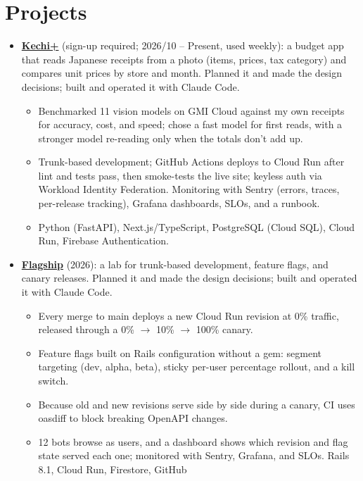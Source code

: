 \documentclass[10pt,letterpaper]{article}
\newcommand{\extlink}[2]{\href{#1}{\color{accent}#2}}
\begin{document}
\section*{Projects}
\begin{itemize}\sloppy
  \item \extlink{https://kechi-plus-g6bg.web.app/}{\textbf{Kechi+}} (sign-up required;
    2026/10 -- Present, used weekly): a budget app that reads Japanese receipts from a photo (items, prices, tax
    category) and compares unit prices by store and month. Planned it and made the design decisions;
    built and operated it with Claude Code.
    \begin{itemize}
      \item Benchmarked 11 vision models on GMI Cloud against my own receipts for accuracy, cost,
        and speed; chose a fast model for first reads, with a stronger model re-reading only when
        the totals don't add up.
      \item Trunk-based development; GitHub Actions deploys to Cloud Run after lint and tests pass,
        then smoke-tests the live site; keyless auth via Workload Identity Federation. Monitoring
        with Sentry (errors, traces, per-release tracking), Grafana dashboards, SLOs, and a runbook.
      \item Python (FastAPI), Next.js/TypeScript, PostgreSQL (Cloud SQL), Cloud Run, Firebase
        Authentication.
    \end{itemize}
  \item \extlink{https://github.com/gill876/trunk-development-feature-flag}{\textbf{Flagship}}
    (2026): a lab for trunk-based development, feature flags, and canary releases. Planned it and
    made the design decisions; built and operated it with Claude Code.
    \begin{itemize}
      \item Every merge to main deploys a new Cloud Run revision at 0\% traffic, released through a
        0\% $\rightarrow$ 10\% $\rightarrow$ 100\% canary.
      \item Feature flags built on Rails configuration without a gem: segment targeting (dev, alpha,
        beta), sticky per-user percentage rollout, and a kill switch.
      \item Because old and new revisions serve side by side during a canary, CI uses oasdiff to
        block breaking OpenAPI changes.
      \item 12 bots browse as users, and a dashboard shows which revision and flag state served
        each one; monitored with Sentry, Grafana, and SLOs. Rails 8.1, Cloud Run, Firestore, GitHub

\end{itemize}
\end{itemize}
\end{document}
